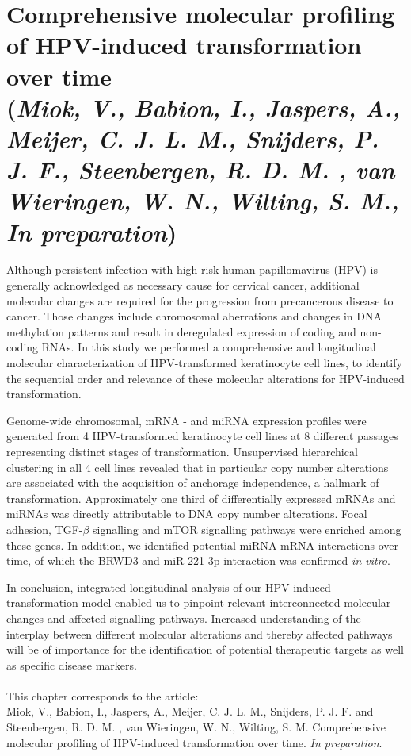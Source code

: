 \chapter{Comprehensive molecular profiling of HPV-induced transformation over time \\{\footnotesize(\textit{Miok, V., Babion, I., Jaspers, A., Meijer, C. J. L. M., Snijders, P. J. F., Steenbergen, R. D. M. , van Wieringen, W. N., Wilting, S. M., In preparation})}}
\label{chapter:Window estimator}

\graphicspath{{Chapter5/Figs/}{Chapter5/Figs/PDF/}{Chapter5/Figs/}}%


Although persistent infection with high-risk human papillomavirus (HPV) is generally acknowledged as necessary cause for cervical cancer, additional molecular changes are required for the progression from precancerous disease to cancer. Those changes include chromosomal aberrations and changes in DNA methylation patterns and result in deregulated expression of coding and non-coding RNAs. In this study we performed a comprehensive and longitudinal molecular characterization of HPV-transformed keratinocyte cell lines, to identify the sequential order and relevance of these molecular alterations for HPV-induced transformation.

Genome-wide chromosomal, mRNA - and miRNA expression profiles were generated from 4 HPV-transformed keratinocyte cell lines at 8 different passages representing distinct stages of transformation. Unsupervised hierarchical clustering in all 4 cell lines revealed that in particular copy number alterations are associated with the acquisition of anchorage independence, a hallmark of transformation. Approximately one third of differentially expressed mRNAs and miRNAs was directly attributable to DNA copy number alterations. Focal adhesion, TGF-$\beta$ signalling and mTOR signalling pathways were enriched among these genes. In addition, we identified potential miRNA-mRNA interactions over time, of which the BRWD3 and miR-221-3p interaction was confirmed \textit{in vitro}.

In conclusion, integrated longitudinal analysis of our HPV-induced transformation model enabled us to pinpoint relevant interconnected molecular changes and affected signalling pathways. Increased understanding of the interplay between different molecular alterations and thereby affected pathways  will be of importance for the identification of potential therapeutic targets as well as specific disease markers.
\\
\\
This chapter corresponds to the article:\\
 Miok, V., Babion, I., Jaspers, A., Meijer, C. J. L. M., Snijders, P. J. F. and Steenbergen, R. D. M. , van Wieringen, W. N., Wilting, S. M. Comprehensive molecular profiling of HPV-induced transformation over time. \textit{In preparation}.

